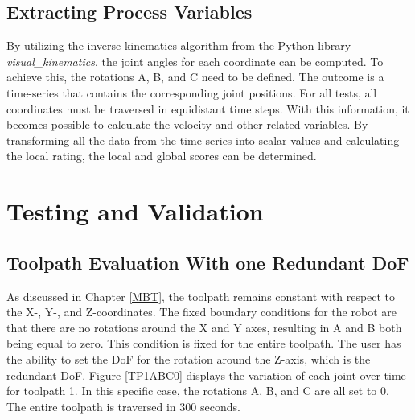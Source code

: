 \subsection{Extracting Process Variables}
By utilizing the inverse kinematics algorithm from the Python library \textit{visual\_kinematics}, the joint angles for each coordinate can be computed. To achieve this, the rotations A, B, and C need to be defined. The outcome is a time-series that contains the corresponding joint positions. For all tests, all coordinates must be traversed in equidistant time steps. With this information, it becomes possible to calculate the velocity and other related variables. By transforming all the data from the time-series into scalar values and calculating the local rating, the local and global scores can be determined.

\section{Testing and Validation}%

\subsection{Toolpath Evaluation With one Redundant DoF}
As discussed in Chapter \ref{MBT}, the toolpath remains constant with respect to the X-, Y-, and Z-coordinates. The fixed boundary conditions for the robot are that there are no rotations around the X and Y axes, resulting in A and B both being equal to zero. This condition is fixed for the entire toolpath. The user has the ability to set the \acrshort{DoF} for the rotation around the Z-axis, which is the redundant \acrshort{DoF}. Figure \ref{TP1ABC0} displays the variation of each joint over time for toolpath 1. In this specific case, the rotations A, B, and C are all set to 0. The entire toolpath is traversed in 300 seconds.


